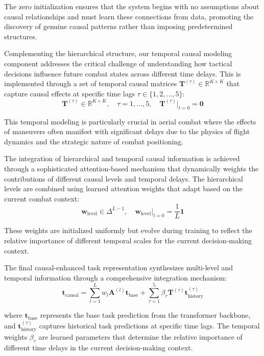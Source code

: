 \documentclass[12pt]{article}
\begin{document}
The zero initialization ensures that the system begins with no assumptions about causal relationships and must learn these connections from data, promoting the discovery of genuine causal patterns rather than imposing predetermined structures.

Complementing the hierarchical structure, our temporal causal modeling component addresses the critical challenge of understanding how tactical decisions influence future combat states across different time delays. This is implemented through a set of temporal causal matrices $\mathbf{T}^{(\tau)} \in \mathbb{R}^{K \times K}$ that capture causal effects at specific time lags $\tau \in \{1, 2, ..., 5\}$:
\begin{equation}
\mathbf{T}^{(\tau)} \in \mathbb{R}^{K\times K},\quad \tau=1,\dots,5,\quad \mathbf{T}^{(\tau)}\big|_{t=0}=\mathbf{0}
\end{equation}

This temporal modeling is particularly crucial in aerial combat where the effects of maneuvers often manifest with significant delays due to the physics of flight dynamics and the strategic nature of combat positioning.

The integration of hierarchical and temporal causal information is achieved through a sophisticated attention-based mechanism that dynamically weights the contributions of different causal levels and temporal delays. The hierarchical levels are combined using learned attention weights that adapt based on the current combat context:
\begin{equation}
\mathbf{w}_{\mathrm{level}}\in\Delta^{L-1},\quad \mathbf{w}_{\mathrm{level}}\big|_{t=0}=\frac{1}{L}\mathbf{1}
\end{equation}

These weights are initialized uniformly but evolve during training to reflect the relative importance of different temporal scales for the current decision-making context.

The final causal-enhanced task representation synthesizes multi-level and temporal information through a comprehensive integration mechanism:
\begin{equation}
\mathbf{t}_{\text{causal}} = \sum_{l=1}^{L} w_l \mathbf{A}^{(l)} \mathbf{t}_{\text{base}} + \sum_{\tau=1}^{5} \beta_\tau \mathbf{T}^{(\tau)} \mathbf{t}_{\text{history}}^{(\tau)}
\end{equation}

where $\mathbf{t}_{\text{base}}$ represents the base task prediction from the transformer backbone, and $\mathbf{t}_{\text{history}}^{(\tau)}$ captures historical task predictions at specific time lags. The temporal weights $\beta_\tau$ are learned parameters that determine the relative importance of different time delays in the current decision-making context.
\end{document}
